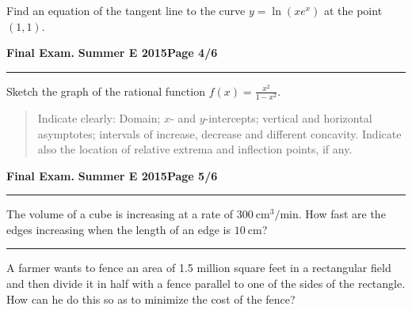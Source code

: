 \documentclass[12pt]{article}
\theoremstyle{definition}
\begin{document}
{{{\problem[10 pts] Find an equation of the tangent line to the curve
$y=\ln( x e^x)$ at the point $(1,1)$.}
\vspace{8cm}
\begin{flushright}
\end{flushright}

\newpage

\hfill{\large\bf Final Exam.}\hfill{\large\bf
  Summer E 2015}\hfill{\large\bf Page 4/6}\hrule

\bigskip
{\problem[20 pts] Sketch the graph of the rational function $f(x)
  = \displaystyle{\frac{x^2}{1-x^2}}$.}
\begin{quotation}
{\small \noindent
Indicate clearly: Domain; $x$- and $y$-intercepts; vertical and horizontal asymptotes; intervals of increase, decrease and different concavity. Indicate also the location of relative extrema and inflection points, if any.}
\end{quotation}

\newpage

\hfill{\large\bf Final Exam.}\hfill{\large\bf
  Summer E 2015}\hfill{\large\bf Page 5/6}\hrule
  
\bigskip

{\problem[10 pts] The volume of a cube is increasing at a rate of
  $300~\text{cm}^3/\text{min}$.  How fast are the edges increasing
  when the length of an edge is $10~\text{cm}$?}
\vspace{8cm}
\begin{flushright}
\end{flushright}
\hrule
{\problem[10 pts] A farmer wants to fence an area of 1.5 million square feet in a rectangular field and then divide it in half with a fence parallel to one of the sides of the rectangle.  How can he do this so as to minimize the cost of the fence?}
\vspace{8cm}
\begin{flushright}
\end{flushright}
\newpage

}}
\end{document}
